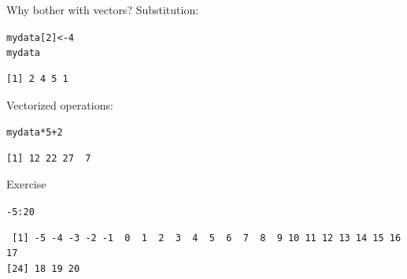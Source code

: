 \documentclass[10pt]{beamer}\usepackage[]{graphicx}\usepackage[]{color}
\makeatletter
\newcommand{\hlnum}[1]{\textcolor[rgb]{0.686,0.059,0.569}{#1}}%
\newcommand{\hlopt}[1]{\textcolor[rgb]{0,0,0}{#1}}%
\newcommand{\hlstd}[1]{\textcolor[rgb]{0.345,0.345,0.345}{#1}}%
\newcommand{\hlkwb}[1]{\textcolor[rgb]{0.69,0.353,0.396}{#1}}%
\newenvironment{kframe}{%
 \def\at@end@of@kframe{}%
 \ifinner\ifhmode%
  \def\at@end@of@kframe{\end{minipage}}%
  \begin{minipage}{\columnwidth}%
 \fi\fi%
 \def\FrameCommand##1{\hskip\@totalleftmargin \hskip-\fboxsep
 \colorbox{shadecolor}{##1}\hskip-\fboxsep
     \hskip-\linewidth \hskip-\@totalleftmargin \hskip\columnwidth}%
 \MakeFramed {\advance\hsize-\width
   \@totalleftmargin\z@ \linewidth\hsize
   \@setminipage}}%
 {\par\unskip\endMakeFramed%
 \at@end@of@kframe}
\newenvironment{knitrout}{}{} %
\makeatother
\begin{document}
  \begin{frame}[fragile]{Why bother with vectors?}
  Substitution:
\begin{knitrout}
\color{fgcolor}\begin{kframe}
\begin{alltt}
  \hlstd{mydata[}\hlnum{2}\hlstd{]} \hlkwb{<-} \hlnum{4}
  \hlstd{mydata}
\end{alltt}
\begin{verbatim}
[1] 2 4 5 1
\end{verbatim}
\end{kframe}
\end{knitrout}

  Vectorized operations:
\begin{knitrout}
\color{fgcolor}\begin{kframe}
\begin{alltt}
  \hlstd{mydata}\hlopt{*}\hlnum{5} \hlopt{+} \hlnum{2}
\end{alltt}
\begin{verbatim}
[1] 12 22 27  7
\end{verbatim}
\end{kframe}
\end{knitrout}
\end{frame}

\begin{frame}[fragile]{Exercise}

\begin{knitrout}
\color{fgcolor}\begin{kframe}
\begin{alltt}
  \hlopt{-}\hlnum{5}\hlopt{:}\hlnum{20}
\end{alltt}
\begin{verbatim}
 [1] -5 -4 -3 -2 -1  0  1  2  3  4  5  6  7  8  9 10 11 12 13 14 15 16 17
[24] 18 19 20
\end{verbatim}
\end{kframe}
\end{knitrout}

\end{frame}
\end{document}
